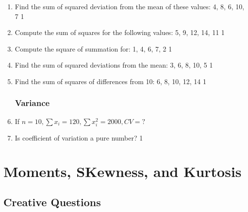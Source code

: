 \documentclass[a4paper,oneside]{book}
\begin{document}
\begin{enumerate}
\item Find the sum of squared deviation from the mean of these values: 4, 8, 6, 10, 7 \hfill 1  

\item Compute the sum of squares for the following values: 5, 9, 12, 14, 11 \hfill 1  

\item Compute the square of summation for: 1, 4, 6, 7, 2 \hfill 1  

\item Find the sum of squared deviations from the mean: 3, 6, 8, 10, 5 \hfill 1  

\item Find the sum of squares of differences from 10: 6, 8, 10, 12, 14 \hfill 1  



\subsection{Variance}
\item If $n=10, \sum x_i = 120, \sum x_i^2=2000, CV=?$
\item Is coefficient of variation a pure number? \hfill 1

\end{enumerate}


\chapter{Moments, SKewness, and Kurtosis} 
\section{Creative Questions}
\end{document}
